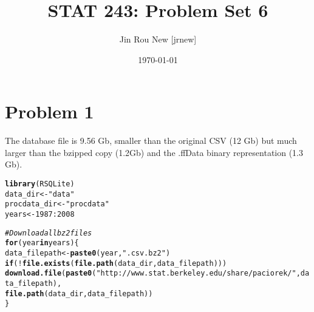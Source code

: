 \documentclass{article}\usepackage[]{graphicx}\usepackage[]{color}
\title{STAT 243: Problem Set 6}
\author{Jin Rou New [jrnew]}
\date{\today}
\makeatletter
\newcommand{\hlnum}[1]{\textcolor[rgb]{0.686,0.059,0.569}{#1}}%
\newcommand{\hlstr}[1]{\textcolor[rgb]{0.192,0.494,0.8}{#1}}%
\newcommand{\hlcom}[1]{\textcolor[rgb]{0.678,0.584,0.686}{\textit{#1}}}%
\newcommand{\hlopt}[1]{\textcolor[rgb]{0,0,0}{#1}}%
\newcommand{\hlstd}[1]{\textcolor[rgb]{0.345,0.345,0.345}{#1}}%
\newcommand{\hlkwa}[1]{\textcolor[rgb]{0.161,0.373,0.58}{\textbf{#1}}}%
\newcommand{\hlkwb}[1]{\textcolor[rgb]{0.69,0.353,0.396}{#1}}%
\newcommand{\hlkwd}[1]{\textcolor[rgb]{0.737,0.353,0.396}{\textbf{#1}}}%
\newenvironment{kframe}{%
 \def\at@end@of@kframe{}%
 \ifinner\ifhmode%
  \def\at@end@of@kframe{\end{minipage}}%
  \begin{minipage}{\columnwidth}%
 \fi\fi%
 \def\FrameCommand##1{\hskip\@totalleftmargin \hskip-\fboxsep
 \colorbox{shadecolor}{##1}\hskip-\fboxsep
     \hskip-\linewidth \hskip-\@totalleftmargin \hskip\columnwidth}%
 \MakeFramed {\advance\hsize-\width
   \@totalleftmargin\z@ \linewidth\hsize
   \@setminipage}}%
 {\par\unskip\endMakeFramed%
 \at@end@of@kframe}
\newenvironment{knitrout}{}{} %
\makeatother
\begin{document}
\maketitle

\section{Problem 1}
The database file is 9.56 Gb, smaller than the original CSV (12 Gb) but much larger than the bzipped copy (1.2Gb) and the .ffData binary representation (1.3 Gb).

\begin{knitrout}
\color{fgcolor}\begin{kframe}
\begin{alltt}
\hlkwd{library}\hlstd{(RSQLite)}
\hlstd{data_dir} \hlkwb{<-} \hlstr{"data"}
\hlstd{procdata_dir} \hlkwb{<-} \hlstr{"procdata"}
\hlstd{years} \hlkwb{<-} \hlnum{1987}\hlopt{:}\hlnum{2008}

\hlcom{# Download all bz2 files}
\hlkwa{for} \hlstd{(year} \hlkwa{in} \hlstd{years) \{}
  \hlstd{data_filepath} \hlkwb{<-} \hlkwd{paste0}\hlstd{(year,}\hlstr{".csv.bz2"}\hlstd{)}
  \hlkwa{if} \hlstd{(}\hlopt{!}\hlkwd{file.exists}\hlstd{(}\hlkwd{file.path}\hlstd{(data_dir, data_filepath)))}
    \hlkwd{download.file}\hlstd{(}\hlkwd{paste0}\hlstd{(}\hlstr{"http://www.stat.berkeley.edu/share/paciorek/"}\hlstd{, data_filepath),}
                  \hlkwd{file.path}\hlstd{(data_dir, data_filepath))}
\hlstd{\}}


\end{alltt}
\end{kframe}
\end{knitrout}
\end{document}
